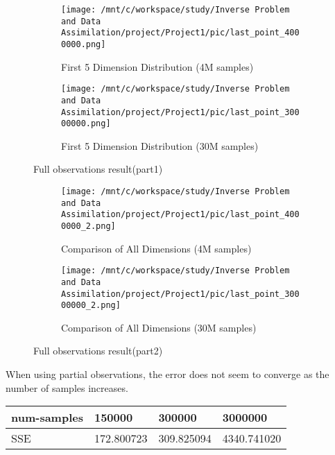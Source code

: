 \documentclass[11pt,reqno]{amsart}
\begin{document}
\begin{figure}[H] %
  \centering
  \begin{subfigure}[h]{0.45\textwidth}
      \centering
      \texttt{[image: /mnt/c/workspace/study/Inverse Problem and Data Assimilation/project/Project1/pic/last\_point\_4000000.png]} %
  \caption{First 5 Dimension Distribution (4M samples)}
      \label{fig:dim1-4m}
  \end{subfigure}
  \hfill
  \begin{subfigure}[h]{0.45\textwidth}
      \centering
      \texttt{[image: /mnt/c/workspace/study/Inverse Problem and Data Assimilation/project/Project1/pic/last\_point\_30000000.png]} %
  \caption{First 5 Dimension Distribution (30M samples)}
      \label{fig:dim1-30m}
  \end{subfigure}

  \caption{Full observations result(part1)}
  \label{fig:distribution-comparison1}
\end{figure}
\begin{figure}[H] %
  \begin{subfigure}[h]{0.4\textwidth}
      \centering
      \texttt{[image: /mnt/c/workspace/study/Inverse Problem and Data Assimilation/project/Project1/pic/last\_point\_4000000\_2.png]} %
  \caption{Comparison of All Dimensions (4M samples)}
      \label{fig:comparison-4m}
  \end{subfigure}
  \hfill
  \begin{subfigure}[h]{0.4\textwidth}
      \centering
      \texttt{[image: /mnt/c/workspace/study/Inverse Problem and Data Assimilation/project/Project1/pic/last\_point\_30000000\_2.png]} %
  \caption{Comparison of All Dimensions (30M samples)}
      \label{fig:comparison-30m}
  \end{subfigure}

  \caption{Full observations result(part2)}
  \label{fig:distribution-comparison2}
\end{figure}

When using partial observations, the error does not seem to converge as the number of samples increases.
\begin{table}[H]
  \begin{tabular}{|l|l|l|l|}
  \hline
  num-samples & 150000             & 300000    & 3000000        \\ \hline
  SSE         & 172.800723 & 309.825094 & 4340.741020 \\ \hline
  \end{tabular}
\end{table}
\end{document}
